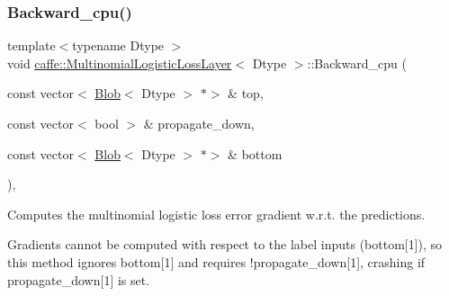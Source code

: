 \subsubsection{\texorpdfstring{Backward\+\_\+cpu()}{Backward\_cpu()}\hspace{0.1cm}{\footnotesize\ttfamily [1/2]}}
{\footnotesize\ttfamily template$<$typename Dtype $>$ \\
void \mbox{\hyperlink{classcaffe_1_1_multinomial_logistic_loss_layer}{caffe\+::\+Multinomial\+Logistic\+Loss\+Layer}}$<$ Dtype $>$\+::Backward\+\_\+cpu (\begin{DoxyParamCaption}\item[{const vector$<$ \mbox{\hyperlink{classcaffe_1_1_blob}{Blob}}$<$ Dtype $>$ $\ast$$>$ \&}]{top,  }\item[{const vector$<$ bool $>$ \&}]{propagate\+\_\+down,  }\item[{const vector$<$ \mbox{\hyperlink{classcaffe_1_1_blob}{Blob}}$<$ Dtype $>$ $\ast$$>$ \&}]{bottom }\end{DoxyParamCaption})\hspace{0.3cm}{\ttfamily [protected]}, {\ttfamily [virtual]}}



Computes the multinomial logistic loss error gradient w.\+r.\+t. the predictions. 

Gradients cannot be computed with respect to the label inputs (bottom\mbox{[}1\mbox{]}), so this method ignores bottom\mbox{[}1\mbox{]} and requires !propagate\+\_\+down\mbox{[}1\mbox{]}, crashing if propagate\+\_\+down\mbox{[}1\mbox{]} is set.


